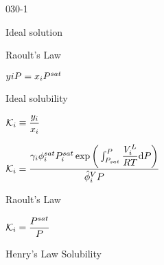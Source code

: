 \begin{mitframe}{030-1}
\begin{listone}
\begin{listtwo}
\begin{listthree}
                                   
            	\begin{listfour}
                
                	\item Ideal solution

				\end{listfour}                

			\end{listthree}            
        
        \end{listtwo}
        	
       	\item Raoult's Law

        \begin{listtwo}

			\item $y{\state}\p=\specfrac{i}\p^{sat}$
            
            
            \item Ideal solubility
            
        \end{listtwo}    
           \item$\partcoeff\equiv\dfrac{y_{\state}}{\specfrac{i}}$
        
        \begin{listtwo}

			\item $\partcoeff=\dfrac{\actcoeff\eleccoeff_{\state}^{sat}\p_{\state}^{sat}\exp\bigg(\int\nolimits_{\p_{sat}}^{\p}\dfrac{\vol_{\state}^{\length}}{\gasconst\Temp}\mathrm{d}\p\bigg)}{\hat{\eleccoeff}_{\state}^{\vol}\p}$
            
            \item Raoult's Law
                       
        	\begin{listthree}

				\item $\partcoeff=\dfrac{\p^{sat}}{\p}$          
            	
        	\end{listthree}    
            
        \end{listtwo}    
        
        \item Henry's Law Solubility        
        
        \begin{listtwo}


\end{listtwo}
\end{listone}
\end{mitframe}
